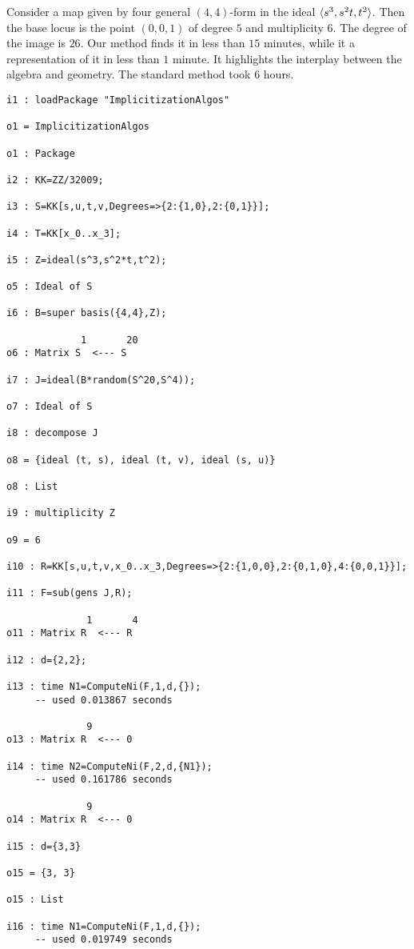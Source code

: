 \documentclass[fleqn,reqno]{amsart}
\begin{document}
\begin{example}[$\mt{ex604}$]
\label{ex604}
Consider a map given by four general $(4,4)$-form in the ideal $\langle s^3,s^2t,t^2\rangle$.
Then the base locus is the point $(0,0,1)$ of degree $5$ and multiplicity $6$.
The degree of the image is $26$.
Our method finds it in less than $15$ minutes,
while it a representation of it in less than $1$ minute.
It highlights the interplay between the algebra and geometry.
The standard method took 6 hours.
\begin{verbatim}
i1 : loadPackage "ImplicitizationAlgos"

o1 = ImplicitizationAlgos

o1 : Package

i2 : KK=ZZ/32009;

i3 : S=KK[s,u,t,v,Degrees=>{2:{1,0},2:{0,1}}];

i4 : T=KK[x_0..x_3];

i5 : Z=ideal(s^3,s^2*t,t^2);

o5 : Ideal of S

i6 : B=super basis({4,4},Z);

             1       20
o6 : Matrix S  <--- S

i7 : J=ideal(B*random(S^20,S^4));

o7 : Ideal of S

i8 : decompose J

o8 = {ideal (t, s), ideal (t, v), ideal (s, u)}

o8 : List

i9 : multiplicity Z

o9 = 6

i10 : R=KK[s,u,t,v,x_0..x_3,Degrees=>{2:{1,0,0},2:{0,1,0},4:{0,0,1}}];

i11 : F=sub(gens J,R);

              1       4
o11 : Matrix R  <--- R

i12 : d={2,2};

i13 : time N1=ComputeNi(F,1,d,{});
     -- used 0.013867 seconds

              9
o13 : Matrix R  <--- 0

i14 : time N2=ComputeNi(F,2,d,{N1});
     -- used 0.161786 seconds

              9
o14 : Matrix R  <--- 0

i15 : d={3,3}

o15 = {3, 3}

o15 : List

i16 : time N1=ComputeNi(F,1,d,{});
     -- used 0.019749 seconds


\end{verbatim}
\end{example}
\end{document}

